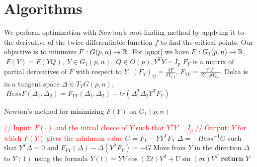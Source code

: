 \documentclass[a4paper]{article}
\begin{document}
\section{Algorithms}
We perform optimization with Newton's root-finding method by applying it to the derivative of the twice differentiable function $f$ to find the critical points.
Our objective is to minimize $F: G(p,n) \to \mathbb{R}$. \newline
For \ref{quot} we have $F: G_1(p,n) \to \mathbb{R} $, $ \; F(Y) = F(YQ), \; Y \in G_1(p,n), \; Q \in O(p), Y^T Y = I_p$
\newline
$F_Y$ is a matrix of partial derivatives of $F$ with respect to $Y$. 
$(F_{Y})_{ij} = \frac{\delta F}{\delta Y_{i,j}} $, $ F_{YY} = \frac{\delta^2 F}{\delta Y_{i,j}\delta Y_{k,l}}$. 
\newline
Delta is in a tangent space $\Delta \in T_{Y} G(p,n)$,
$ \; Hess F(\Delta_1, \Delta_2) = F_{YY}(\Delta_1, \Delta_2) - tr(\Delta_1^T \Delta_2 Y^T F_Y) $
\newline
\begin{algorithm}
\caption{Newton's method for minimizing $F(Y)$ on $G_1(p,n)$ }\label{alg:quotAlg}
\begin{algorithmic}[1]
\State \textcolor{red}{// Input: $F(\cdot)$ and the initial choice of $Y$ such that $Y^T Y = I_p$}
\State \textcolor{red}{// Output: $Y$ for which $F(Y)$ gives the minimum value}
\State $G = F_Y - Y Y^T F_Y$
\State $\Delta = -Hess^{-1} G$ such that $Y^T \Delta = 0$ and $F_{YY}(\Delta) - \Delta(Y^T F_Y) = -G$
\State
\State Move from $Y$ in the direction $\Delta$ to $Y(1)$ using the formula 
\State $Y(t) = Y V \cos(\Sigma t) V^T + U \sin(\sigma t) V^T$ 
\EndWhile
\State \textbf{return} $Y$
\EndProcedure
\end{algorithmic}
\end{algorithm}
\end{document}
